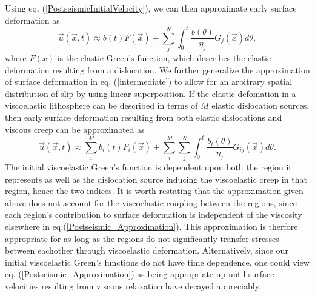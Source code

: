 \documentclass[extra,mreferee]{gji}
\begin{document}
Using eq. (\ref{PostseismicInitialVelocity}), we can then approximate
early surface deformation as
\begin{equation}\label{intermediate}
\vec{u}(\vec{x},t) \approx b(t)F(\vec{x}) + \sum_j^N\int_0^t
\frac{b(\theta)}{\eta_j}G_j(\vec{x}) d\theta,
\end{equation}
where $F(x)$ is the elastic Green's function, which describes the
elastic deformation resulting from a dislocation.  We further
generalize the approximation of surface deformation in
eq. (\ref{intermediate}) to allow for an arbitrary spatial
distribution of slip by using linear superposition.  If the elastic
defomation in a viscoelastic lithosphere can be described in terms of
$M$ elastic dislocation sources, then early surface deformation
resulting from both elastic dislocations and viscous creep can be
approximated as
\begin{equation}\label{Postseismic_Approximation}
\vec{u}(\vec{x},t) \approx \sum_i^Mb_i(t)F_i(\vec{x}) +
\sum_i^M\sum_j^N\int_0^t\frac{b_i(\theta)}{\eta_j}G_{ij}(\vec{x}) d\theta.
\end{equation}
The initial viscoelastic Green's function is dependent upon both the
region it represents as well as the dislocation source inducing
the viscoelastic creep in that region, hence the two indices.  It is
worth restating that the approximation given above does not account
for the viscoelastic coupling between the regions, since each region's
contribution to surface deformation is independent of the viscosity
elsewhere in eq.(\ref{Postseismic_Approximation}).  This approximation
is therfore appropriate for as long as the regions do not
significantly transfer stresses between eachother through viscoelastic
deformation.  Alternatively, since our initial viscoelastic Green's
functions do not have time dependence, one could view
eq. (\ref{Postseismic_Approximation}) as being appropriate up until
surface velocities resulting from viscous relaxation have decayed
appreciably.
\end{document}
